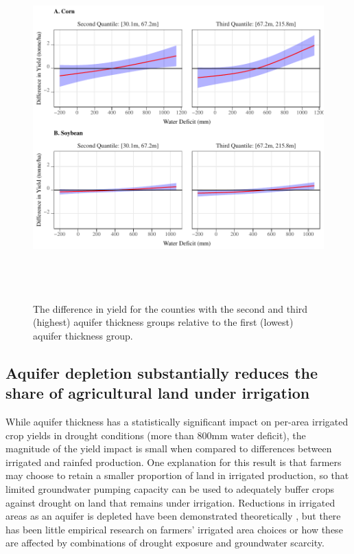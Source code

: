 \documentclass[
]{article}
\begin{document}
\begin{figure}[H]

{\centering \includegraphics[width=6in,height=500px,]{Figures/g_ir_yield_dif} 

}

\caption{The difference in yield for the counties with the second and third (highest) aquifer thickness groups relative to the first (lowest) aquifer thickness group.}\label{fig:yield-dif}
\end{figure}

\hypertarget{impact-share}{%
\subsection{Aquifer depletion substantially reduces the share of agricultural land under irrigation}\label{impact-share}}

While aquifer thickness has a statistically significant impact on per-area irrigated crop yields in drought conditions (more than 800mm water deficit), the magnitude of the yield impact is small when compared to differences between irrigated and rainfed production. One explanation for this result is that farmers may choose to retain a smaller proportion of land in irrigated production, so that limited groundwater pumping capacity can be used to adequately buffer crops against drought on land that remains under irrigation. Reductions in irrigated areas as an aquifer is depleted have been demonstrated theoretically \citep{rad2020effects, foster2014modeling, hrozencik2017heterogeneous, deines2020transitions}, but there has been little empirical research on farmers' irrigated area choices or how these are affected by combinations of drought exposure and groundwater scarcity.
\end{document}
